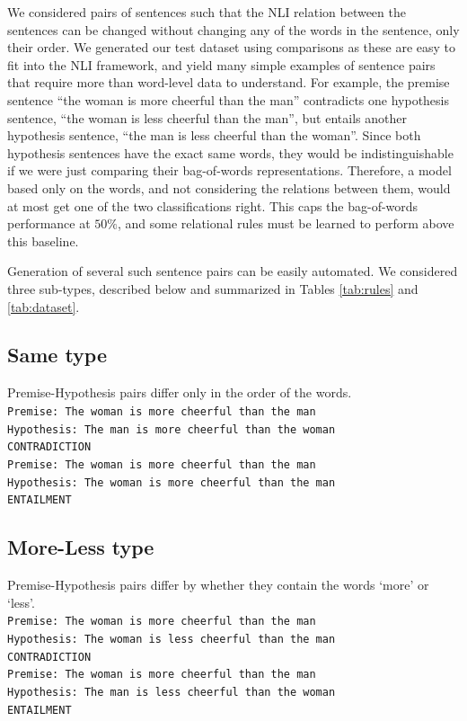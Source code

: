 We considered pairs of sentences such that the NLI relation between the sentences can be changed without changing any of the words in the sentence, only their order. We generated our test dataset using comparisons as these are easy to fit into the NLI framework, and yield many simple examples of sentence pairs that require more than word-level data to understand. For example, the premise sentence ``the woman is more cheerful than the man'' contradicts one hypothesis sentence, ``the woman is less cheerful than the man'', but entails another hypothesis sentence, ``the man is less cheerful than the woman''. Since both hypothesis sentences have the exact same words, they would be indistinguishable if we were just comparing their bag-of-words representations. Therefore, a model based only on the words, and not considering the relations between them, would at most get one of the two classifications right. This caps the bag-of-words performance at $50\%$, and some relational rules must be learned to perform above this baseline. 

Generation of several such sentence pairs can be easily automated. We considered three sub-types, described below and summarized in Tables \ref{tab:rules} and \ref{tab:dataset}.
 
\subsection{Same type}
Premise-Hypothesis pairs differ only in the order of the words. \\
{\tt Premise: The woman is more cheerful than the man \\ Hypothesis: The man is more cheerful than the woman \\ CONTRADICTION \\} {\tt Premise: The woman is more cheerful than the man \\ Hypothesis: The woman is more cheerful than the man\\ ENTAILMENT}

\subsection{More-Less type}
Premise-Hypothesis pairs differ by whether they contain the words `more' or `less'. \\
{\tt Premise: The woman is more cheerful than the man \\ Hypothesis: The woman is less cheerful than the man\\ CONTRADICTION \\}{\tt Premise: The woman is more cheerful than the man \\ Hypothesis: The man is less cheerful than the woman \\ ENTAILMENT} 

